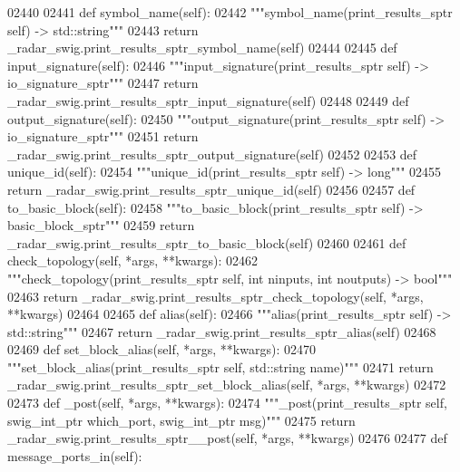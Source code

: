 \begin{DoxyCode}
{{{{{{{{{02440 
02441     \textcolor{keyword}{def }symbol_name(self):
02442         \textcolor{stringliteral}{"""symbol\_name(print\_results\_sptr self) -> std::string"""}
02443         \textcolor{keywordflow}{return} \_radar\_swig.print\_results\_sptr\_symbol\_name(self)
02444 
02445     \textcolor{keyword}{def }input_signature(self):
02446         \textcolor{stringliteral}{"""input\_signature(print\_results\_sptr self) -> io\_signature\_sptr"""}
02447         \textcolor{keywordflow}{return} \_radar\_swig.print\_results\_sptr\_input\_signature(self)
02448 
02449     \textcolor{keyword}{def }output_signature(self):
02450         \textcolor{stringliteral}{"""output\_signature(print\_results\_sptr self) -> io\_signature\_sptr"""}
02451         \textcolor{keywordflow}{return} \_radar\_swig.print\_results\_sptr\_output\_signature(self)
02452 
02453     \textcolor{keyword}{def }unique_id(self):
02454         \textcolor{stringliteral}{"""unique\_id(print\_results\_sptr self) -> long"""}
02455         \textcolor{keywordflow}{return} \_radar\_swig.print\_results\_sptr\_unique\_id(self)
02456 
02457     \textcolor{keyword}{def }to_basic_block(self):
02458         \textcolor{stringliteral}{"""to\_basic\_block(print\_results\_sptr self) -> basic\_block\_sptr"""}
02459         \textcolor{keywordflow}{return} \_radar\_swig.print\_results\_sptr\_to\_basic\_block(self)
02460 
02461     \textcolor{keyword}{def }check_topology(self, *args, **kwargs):
02462         \textcolor{stringliteral}{"""check\_topology(print\_results\_sptr self, int ninputs, int noutputs) -> bool"""}
02463         \textcolor{keywordflow}{return} \_radar\_swig.print\_results\_sptr\_check\_topology(self, *args, **kwargs)
02464 
02465     \textcolor{keyword}{def }alias(self):
02466         \textcolor{stringliteral}{"""alias(print\_results\_sptr self) -> std::string"""}
02467         \textcolor{keywordflow}{return} \_radar\_swig.print\_results\_sptr\_alias(self)
02468 
02469     \textcolor{keyword}{def }set_block_alias(self, *args, **kwargs):
02470         \textcolor{stringliteral}{"""set\_block\_alias(print\_results\_sptr self, std::string name)"""}
02471         \textcolor{keywordflow}{return} \_radar\_swig.print\_results\_sptr\_set\_block\_alias(self, *args, **kwargs)
02472 
02473     \textcolor{keyword}{def }_post(self, *args, **kwargs):
02474         \textcolor{stringliteral}{"""\_post(print\_results\_sptr self, swig\_int\_ptr which\_port, swig\_int\_ptr msg)"""}
02475         \textcolor{keywordflow}{return} \_radar\_swig.print\_results\_sptr\_\_post(self, *args, **kwargs)
02476 
02477     \textcolor{keyword}{def }message_ports_in(self):
}}}}}}}}}
\end{DoxyCode}
